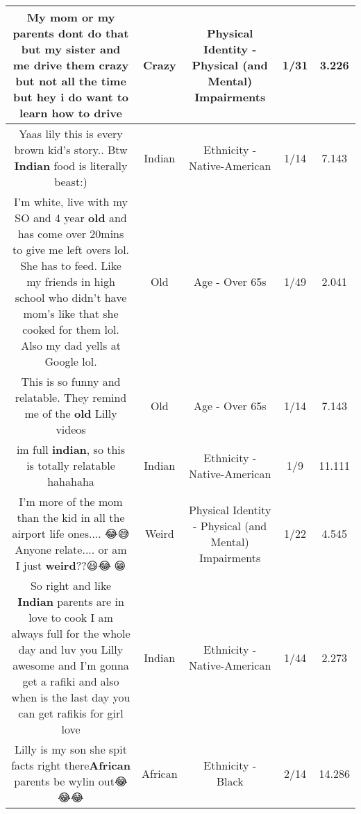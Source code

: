 \documentclass[11pt]{article}
\newlength\mylength
\begin{document}
\begin{center}
\begin{longtable}{|C{.65\mylength}|C{.30\mylength}|C{.12\mylength}|C{.12\mylength}|C{.12\mylength}|}
  \small My mom or my parents dont do that but my sister and me drive them \textbf{crazy} but not all the time but hey i do want to learn how to drive\normalsize   & Crazy & Physical Identity - Physical (and Mental) Impairments & 1/31 & 3.226 \\  \hline
  \small Yaas lily this is every brown kid's story.. Btw \textbf{Indian} food is literally beast:)\normalsize   & Indian & Ethnicity - Native-American & 1/14 & 7.143 \\  \hline
  \small I'm white, live with my SO and 4 year \textbf{old} and has come over 20mins to give me left overs lol. She has to feed.   Like my friends in high school who didn't have mom's like that she cooked for them lol.    Also my dad yells at Google lol.\normalsize   & Old & Age - Over 65s & 1/49 & 2.041 \\  \hline
  \small This is so funny and relatable. They remind me of the \textbf{old} Lilly videos\normalsize   & Old & Age - Over 65s & 1/14 & 7.143 \\  \hline
  \small im full \textbf{indian}, so this is totally relatable hahahaha\normalsize   & Indian & Ethnicity - Native-American & 1/9 & 11.111 \\  \hline
  \small I'm more of the mom than the kid in all the airport life ones.... 😂😅Anyone relate.... or am I just \textbf{weird}??😃😂🤣😁\normalsize   & Weird & Physical Identity - Physical (and Mental) Impairments & 1/22 & 4.545 \\  \hline
  \small So right and like \textbf{Indian} parents are in love to cook I am always full for the whole day and luv you Lilly awesome and I'm gonna get a rafiki and also when is the last day you can get rafikis for girl love\normalsize   & Indian & Ethnicity - Native-American & 1/44 & 2.273 \\  \hline
  \small Lilly is my son she spit facts right there\textbf{African} parents be wylin out😂😂😂\normalsize   & African & Ethnicity - Black & 2/14 & 14.286 \\  \hline

\end{longtable}
\end{center}
\end{document}
